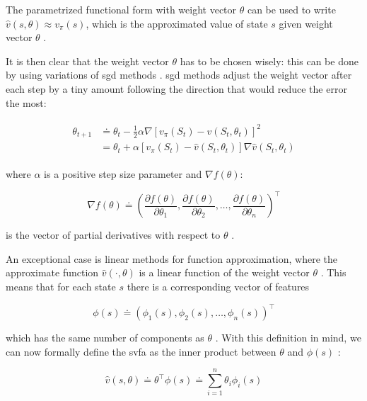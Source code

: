 The parametrized functional form with weight vector $\theta$ can be used to write $\hat{v}(s,\theta) \approx v_\pi (s)$, which is the approximated value of state $s$ given weight vector $\theta$ \citep[p. 191]{Sutton2017}.

It is then clear that the weight vector $\theta$ has to be chosen wisely: this can be done by using variations of \gls{sgd} methods \citep[p. 223]{Sutton2017}. \gls{sgd} methods adjust the weight vector after each step by a tiny amount following the direction that would reduce the error the most:

\begin{align}
	\begin{split}
		\theta_{t+1} &\doteq \theta_t - \frac{1}{2} \alpha \nabla [v_\pi (S_t) - \hat{v} (S_t,\theta_t)]^2\\
		&= \theta_t + \alpha  [v_\pi (S_t) - \hat{v} (S_t,\theta_t)] \nabla \hat{v} (S_t,\theta_t)
	\end{split}
\end{align}

where $\alpha$ is a positive step size parameter and $\nabla f(\theta)$:

\begin{equation}
	\nabla f(\theta) \doteq \left( \frac{\partial f(\theta)}{\partial \theta_1}, \frac{\partial f(\theta)}{\partial \theta_2}, \ldots, \frac{\partial f(\theta)}{\partial \theta_n} \right)^\top
\end{equation}

is the vector of partial derivatives with respect to $\theta$ \citep[p. 195]{Sutton2017}.

An exceptional case is linear methods for function approximation, where the approximate function $\hat{v} (\cdot ,\theta)$ is a linear function of the weight vector $\theta$ \citep[p. 198]{Sutton2017}. This means that for each state $s$ there is a corresponding vector of features

\begin{equation}
	\phi (s) \doteq \left( \phi_1 (s), \phi_2 (s), \ldots, \phi_n (s) \right)^\top
\end{equation}

which has the same number of components as $\theta$ \citep[p. 198]{Sutton2017}. With this definition in mind, we can now formally define the \gls{svfa} as the inner product between $\theta$ and $\phi (s)$ \citep[p. 198]{Sutton2017}:

\begin{equation}
\label{eq:function_approximation_dot}
	\hat{v} (s,\theta) \doteq \theta^\top \phi (s) \doteq \sum_{i=1}^n \theta_i \phi_i (s)
\end{equation}

